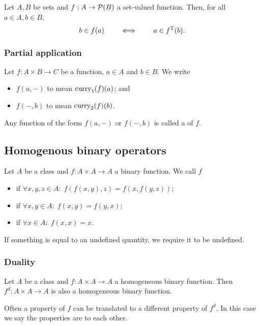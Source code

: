 \begin{lemma} \label{transpositionSetValuedFunctionLemma}
Let $A,B$ be sets and $f: A\to \operatorname{\mathcal{P}}(B)$ a set-valued function. Then, for all $a\in A,b\in B$,
\[ b\in f(a) \qquad\iff\qquad a\in f^{\mathrm{T}}(b). \]
\end{lemma}

\subsubsection{Partial application}
\begin{definition}
Let $f: A\times B \to C$ be a function, $a\in A$ and $b\in B$. We write
\begin{itemize}
\item $f(a, -)$ to mean $\operatorname{curry}_1(f)(a)$; and
\item $f(-, b)$ to mean $\operatorname{curry}_2(f)(b)$.
\end{itemize}
Any function of the form $f(a, -)$ or $f(-,b)$ is called a  of $f$.
\end{definition}

\subsection{Homogenous binary operators}
\begin{definition}
Let $A$ be a class and $f: A\times A \to A$ a binary function. We call $f$
\begin{itemize}
\item {} if $\forall x,y, z\in A: \; f(f(x,y),z) = f(x,f(y,z))$;
\item {} if $\forall x,y\in A: \; f(x,y) = f(y,x)$;
\item {} if $\forall x\in A:\; f(x,x) = x$.
\end{itemize}
If something is equal to an undefined quantity, we require it to be undefined.
\end{definition}

\subsubsection{Duality}
Let $A$ be a class and $f: A\times A \to A$ a homogeneous binary function. Then $f^d: A\times A \to A$ is also a homogeneous binary function.

Often a property of $f$ can be translated to a different property of $f^d$. In this case we say the properties are  to each other.

